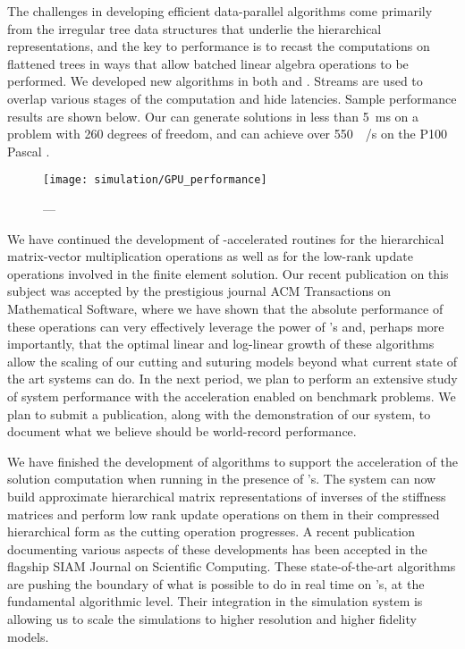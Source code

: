 The challenges in developing efficient data-parallel  algorithms come primarily from the irregular tree data structures that underlie the hierarchical representations, and the key to performance is to recast the computations on flattened trees in ways that allow batched linear algebra operations to be performed. We developed new  algorithms in both  and . Streams are used to overlap various stages of the computation and hide latencies. Sample performance results are shown below. Our  can generate solutions in less than \SI{5}{\milli\second} on a problem with \SI{260}{\kilo} degrees of freedom, and can achieve over \SI{550}{\giga\byte/\second} on the P100 Pascal .

\begin{figure}
  \centering%
	\texttt{[image: simulation/GPU\_performance]}
	\caption{---}\label{fig:gpu_performance}
\end{figure}

We have continued the development of -accelerated routines for the hierarchical matrix-vector multiplication operations as well as for the low-rank update operations involved in the finite element solution. Our recent publication on this subject was accepted by the prestigious journal ACM Transactions on Mathematical Software, where we have shown that the absolute performance of these operations can very effectively leverage the power of 's and, perhaps more importantly, that the optimal linear and log-linear growth of these algorithms allow the scaling of our cutting and suturing models beyond what current state of the art systems can do.  In the next period, we plan to perform an extensive study of system performance with the  acceleration enabled on benchmark problems. We plan to submit a publication, along with the demonstration of our system, to document what we believe should be world-record performance.

We have finished the development of algorithms to support the acceleration of the solution computation when running in the presence of 's.  The system can now build approximate hierarchical matrix representations of inverses of the stiffness matrices and perform low rank update operations on them in their compressed hierarchical form as the cutting operation progresses. A recent publication documenting various aspects of these developments has been accepted in the flagship SIAM Journal on Scientific Computing. These state-of-the-art algorithms are pushing the boundary of what is possible to do in real time on 's, at the fundamental algorithmic level. Their integration in the simulation system is allowing us to scale the simulations to higher resolution and higher fidelity models.

